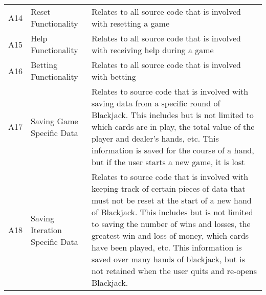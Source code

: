 \documentclass [landscape, 12pt] {article}
\begin{document}
\begin {longtable}{p{4cm} p{4cm} p{10cm}}
			A14 & Reset Functionality & Relates to all source code that is involved with resetting a game\\
			A15 & Help Functionality & Relates to all source code that is involved with receiving help during a game\\
			A16 & Betting Functionality & Relates to all source code that is involved with betting \\
			A17 & Saving Game Specific Data & Relates to source code that is involved with saving data from a specific round of Blackjack.  This includes but is not limited to which cards are in play, the total value of the player and dealer's hands, etc.  This information is saved for the course of a hand, but if the user starts a new game, it is lost \\
			A18 & Saving Iteration Specific Data & Relates to source code that is involved with keeping track of certain pieces of data that must not be reset at the start of a new hand of Blackjack.  This includes but is not limited to saving the number of wins and losses, the greatest win and loss of money, which cards have been played, etc.  This information is saved over many hands of blackjack, but is not retained when the user quits and re-opens Blackjack.\\


\end{longtable}
\end{document}
